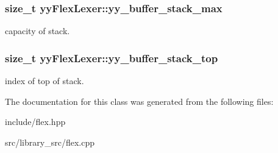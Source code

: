 \subsubsection[{\texorpdfstring{yy\+\_\+buffer\+\_\+stack\+\_\+max}{yy_buffer_stack_max}}]{\setlength{\rightskip}{0pt plus 5cm}size\+\_\+t yy\+Flex\+Lexer\+::yy\+\_\+buffer\+\_\+stack\+\_\+max\hspace{0.3cm}{\ttfamily [protected]}}\hypertarget{classyyFlexLexer_ad94e6d3987eb9dad09041a5cb006da7b}{}\label{classyyFlexLexer_ad94e6d3987eb9dad09041a5cb006da7b}
capacity of stack. 
\subsubsection[{\texorpdfstring{yy\+\_\+buffer\+\_\+stack\+\_\+top}{yy_buffer_stack_top}}]{\setlength{\rightskip}{0pt plus 5cm}size\+\_\+t yy\+Flex\+Lexer\+::yy\+\_\+buffer\+\_\+stack\+\_\+top\hspace{0.3cm}{\ttfamily [protected]}}\hypertarget{classyyFlexLexer_ad30ce09b0f06b749463bb1ddc8f74877}{}\label{classyyFlexLexer_ad30ce09b0f06b749463bb1ddc8f74877}
index of top of stack. 

The documentation for this class was generated from the following files\+:\begin{DoxyCompactItemize}
\item 
include/flex.\+hpp\item 
src/library\+\_\+src/flex.\+cpp\end{DoxyCompactItemize}
